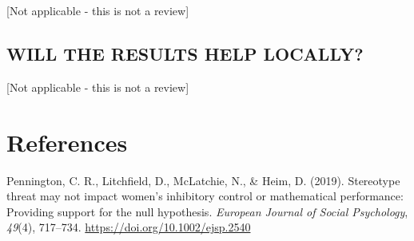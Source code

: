 \documentclass[
  doc, a4paper]{apa7}
\newlength{\cslhangindent}
\newenvironment{CSLReferences}[2] %
 {\begin{list}{}{%
  \setlength{\itemindent}{0pt}
  \setlength{\leftmargin}{0pt}
  \setlength{\parsep}{0pt}
  \ifodd #1
   \setlength{\leftmargin}{\cslhangindent}
   \setlength{\itemindent}{-1\cslhangindent}
  \fi
  \setlength{\itemsep}{#2\baselineskip}}}
 {\end{list}}
\begin{document}
{[}Not applicable - this is not a review{]}

\subsection{WILL THE RESULTS HELP LOCALLY?}\label{will-the-results-help-locally}

{[}Not applicable - this is not a review{]}

\section{References}\label{references}

\label{refs}
\begin{CSLReferences}{1}{0}
Pennington, C. R., Litchfield, D., McLatchie, N., \& Heim, D. (2019). Stereotype threat may not impact women's inhibitory control or mathematical performance: {Providing} support for the null hypothesis. \emph{European Journal of Social Psychology}, \emph{49}(4), 717--734. \url{https://doi.org/10.1002/ejsp.2540}

\end{CSLReferences}
\end{document}
